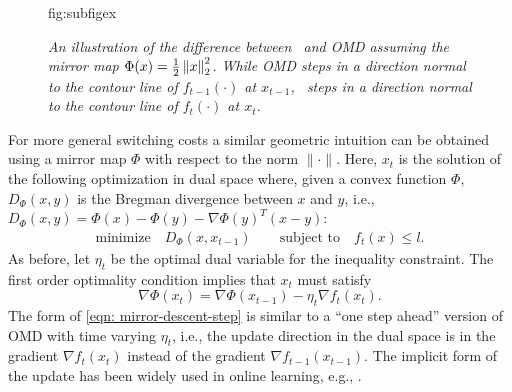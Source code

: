 \begin{figure}[t]
\floatconts
  {fig:subfigex}
  {\caption{\textit{An illustration of the difference between \ourack\ and OMD assuming the mirror map $\Phi(x) = \frac{1}{2}\left\lVert x \right\rVert^2_2$. While OMD steps in a direction normal to the contour line of $f_{t-1}(\cdot)$ at $x_{t-1}$, \ourack\  steps in a direction normal to the contour line of $f_t(\cdot)$ at $x_t$. }}
  \label{fig: comparison}}
  {%
    \qquad \quad
 \vspace{-.2in}
 }
 \vspace{-.15in}
\end{figure}

For more general switching costs a similar geometric intuition can be obtained using a mirror map $\Phi$ with respect to the norm $\| \cdot \|$.  Here, $x_t$ is the solution of the following optimization in dual space where, given a convex function $\Phi$, $D_\Phi(x, y)$ is the Bregman divergence between $x$ and $y$, i.e., $D_\Phi(x, y) = \Phi(x) - \Phi(y) - \nabla \Phi(y)^T(x-y)$: 
\begin{align*}
\text{minimize}  \quad D_{\Phi}(x, x_{t-1}) \qquad
\text{subject to} \quad f_t(x) \le l.
\end{align*}
As before, let $\eta_t$ be the optimal dual variable for the inequality constraint. The first order optimality condition implies that $x_t$ must satisfy 
\begin{equation}
\nabla \Phi(x_t) = \nabla \Phi(x_{t-1}) - \eta_t \nabla f_t (x_t).
\label{eqn: mirror-descent-step}
\end{equation}
The form of \eqref{eqn: mirror-descent-step} is similar to a ``one step ahead'' version of OMD with time varying $\eta_t$, i.e., the update direction in the dual space is in the gradient $\nabla f_t(x_t)$ instead of the gradient $\nabla f_{t-1}(x_{t-1})$. The implicit form of the update has been widely used in online learning, e.g., \cite{kivinen1997exponentiated, kulis2010implicit}.

